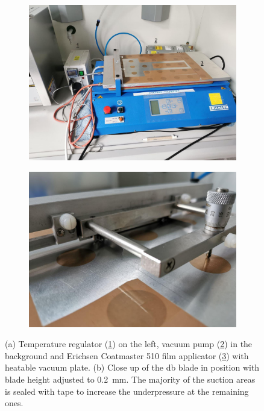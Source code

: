 \begin{figure}
	\centering
	\begin{subfigure}{.49\textwidth}
		\centering
		\includegraphics[width=.99\textwidth]{Pics/erichsen1.png}
		\caption{}
	\end{subfigure}
	\begin{subfigure}{.49\textwidth}
		\centering
		\includegraphics[width=.99\textwidth]{Pics/erichsendb1.png}
		\caption{}
	\end{subfigure}
	\caption{
		(a)
		Temperature regulator (\underline{1}) on the left,
		vacuum pump (\underline{2}) in the background and 
		Erichsen Coatmaster 510 film applicator (\underline{3}) with heatable vacuum plate.
        (b) Close up of the \gls{db} blade in position with blade height adjusted to \SI{0.2}{\milli\meter}.
		The majority of the suction areas is sealed with tape to increase the underpressure at the remaining ones.
	}
	\label{fig:eric}
\end{figure}


